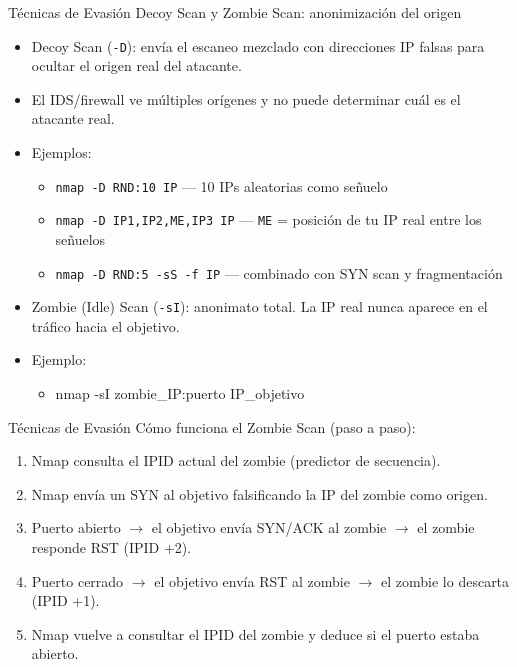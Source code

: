 \documentclass[aspectratio=169,11pt]{beamer}
\newcommand{\cmd}[1]{\texttt{\color{uznavy}#1}}
\newcommand{\cmdbox}[1]{%
  \begin{center}%
  {\setlength{\fboxsep}{6pt}\colorbox{uzlav!40}{\parbox{0.88\linewidth}{\ttfamily\footnotesize #1}}}%
  \end{center}}
\begin{document}
\begin{frame}{Técnicas de Evasión}
\small
Decoy Scan y Zombie Scan: anonimización del origen
  \begin{itemize}
  \item Decoy Scan (\cmd{-D}): envía el escaneo mezclado con direcciones IP falsas para ocultar el origen real del atacante.
  \item El IDS/firewall ve múltiples orígenes y no puede determinar cuál es el atacante real.
  \item Ejemplos:
    \begin{itemize}
    \item \cmd{nmap -D RND:10 IP} --- 10 IPs aleatorias como señuelo
    \item \cmd{nmap -D IP1,IP2,ME,IP3 IP} --- \cmd{ME} = posición de tu IP real entre los señuelos
    \item \cmd{nmap -D RND:5 -sS -f IP} --- combinado con SYN scan y fragmentación
    \end{itemize}
  \item Zombie (Idle) Scan (\cmd{-sI}): anonimato total. La IP real nunca aparece en el tráfico hacia el objetivo.
  \item Ejemplo:
    \begin{itemize}
    \item[] \cmdbox{nmap -sI zombie\_IP:puerto IP\_objetivo}
    \end{itemize}
  \end{itemize}
\end{frame}


\begin{frame}[allowframebreaks]{Técnicas de Evasión}
  \small
  Cómo funciona el Zombie Scan (paso a paso):
  \begin{enumerate}
  \item Nmap consulta el IPID actual del zombie (predictor de secuencia).
  \item Nmap envía un SYN al objetivo falsificando la IP del zombie como origen.
  \item Puerto abierto $\rightarrow$ el objetivo envía SYN/ACK al zombie $\rightarrow$ el zombie responde RST (IPID +2).
  \item Puerto cerrado $\rightarrow$ el objetivo envía RST al zombie $\rightarrow$ el zombie lo descarta (IPID +1).
  \item Nmap vuelve a consultar el IPID del zombie y deduce si el puerto estaba abierto.
  \end{enumerate}
\end{frame}
\end{document}
